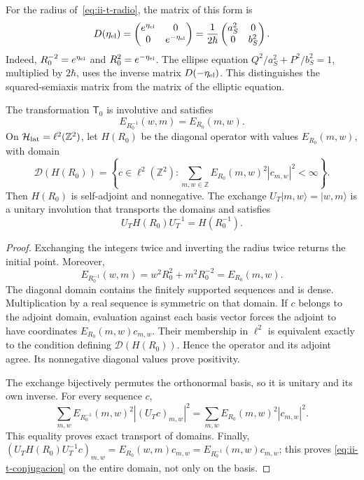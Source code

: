 For the radius of~\eqref{eq:ii-t-radio}, the matrix of this form is
\begin{equation}
 D(\eta_{\rm el})=
 \begin{pmatrix}e^{\eta_{\rm el}}&0\\0&e^{-\eta_{\rm el}}\end{pmatrix}
 =\frac{1}{2\hbar}
 \begin{pmatrix}a_S^2&0\\0&b_S^2\end{pmatrix}.
 \label{eq:ii-t-matriz}
\end{equation}
Indeed, \(R_0^{-2}=e^{\eta_{\rm el}}\) and
\(R_0^2=e^{-\eta_{\rm el}}\). The ellipse equation
\(Q^2/a_S^2+P^2/b_S^2=1\), multiplied by \(2\hbar\), uses
the inverse matrix \(D(-\eta_{\rm el})\). This distinguishes
the squared-semiaxis matrix from the matrix of the elliptic equation.

\begin{theorem}
\label{thm:ii-t-unitaria}
The transformation \(\mathsf T_0\) is involutive and satisfies
\begin{equation}
 E_{R_0^{-1}}(w,m)=E_{R_0}(m,w).
 \label{eq:ii-t-invariancia}
\end{equation}
On \(\mathcal H_{\rm lat}=\ell^2(\mathbb Z^2)\), let \(H(R_0)\)
be the diagonal operator with values \(E_{R_0}(m,w)\), with domain
\[
 \mathcal D(H(R_0))=
 \left\{c\in\ell^2(\mathbb Z^2):
 \sum_{m,w\in\mathbb Z}E_{R_0}(m,w)^2|c_{m,w}|^2<\infty\right\}.
\]
Then \(H(R_0)\) is self-adjoint and nonnegative. The exchange
\(U_T|m,w\rangle=|w,m\rangle\) is a unitary involution that
transports the domains and satisfies
\begin{equation}
 U_T H(R_0)U_T^{-1}=H(R_0^{-1}).
 \label{eq:ii-t-conjugacion}
\end{equation}
\end{theorem}

\begin{proof}
Exchanging the integers twice and inverting the radius twice returns
the initial point. Moreover,
\[
 E_{R_0^{-1}}(w,m)=w^2R_0^2+m^2R_0^{-2}=E_{R_0}(m,w).
\]
The diagonal domain contains the finitely supported sequences and is dense.
Multiplication by a real sequence is symmetric on that domain.
If \(c\) belongs to the adjoint domain, evaluation against each
basis vector forces the adjoint to have coordinates
\(E_{R_0}(m,w)c_{m,w}\). Their membership in \(\ell^2\) is equivalent
exactly to the condition defining \(\mathcal D(H(R_0))\).
Hence the operator and its adjoint agree. Its nonnegative diagonal values
prove positivity.

The exchange bijectively permutes the orthonormal basis, so it is
unitary and its own inverse. For every sequence \(c\),
\[
 \sum_{m,w}E_{R_0^{-1}}(m,w)^2|(U_Tc)_{m,w}|^2
 =\sum_{m,w}E_{R_0}(m,w)^2|c_{m,w}|^2.
\]
This equality proves exact transport of domains. Finally,
\((U_TH(R_0)U_T^{-1}c)_{m,w}=E_{R_0}(w,m)c_{m,w}
=E_{R_0^{-1}}(m,w)c_{m,w}\); this proves
\eqref{eq:ii-t-conjugacion} on the entire domain, not only on the basis.
\end{proof}

